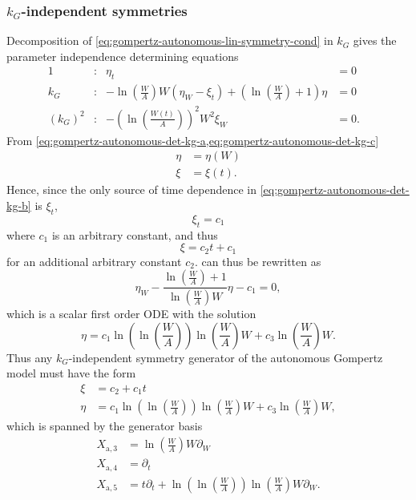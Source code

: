 \subsubsection{\texorpdfstring{\(k_G\)-independent symmetries}{Growth rate-independent symmetries}}

Decomposition of \cref{eq:gompertz-autonomous-lin-symmetry-cond} in \(k_G\) gives the parameter independence determining equations
\begin{subequations}
  \begin{flalign}
    1 & : & \eta_t &= 0 &\label{eq:gompertz-autonomous-det-kg-a}\\
    k_G & : & -\ln\left(\frac{W}{A}\right) W\left(\eta_W - \xi_t\right) + \left(\ln\left(\frac{W}{A}\right) + 1\right) \eta &= 0 &\label{eq:gompertz-autonomous-det-kg-b}\\
    (k_G)^2 & : & -\left(\ln\left(\frac{W(t)}{A}\right)\right)^2 W^2 \xi_W &= 0. &\label{eq:gompertz-autonomous-det-kg-c}
  \end{flalign}
\end{subequations}
From \cref{eq:gompertz-autonomous-det-kg-a,eq:gompertz-autonomous-det-kg-c}
\begin{align*}
  \eta &= \eta(W) \\
  \xi &= \xi(t).
\end{align*}
Hence, since the only source of time dependence in \cref{eq:gompertz-autonomous-det-kg-b} is \(\xi_t\),
\begin{equation*}
  \xi_t = c_1
\end{equation*}
where \(c_1\) is an arbitrary constant, and thus
\begin{equation*}
  \xi = c_2 t + c_1
\end{equation*}
for an additional arbitrary constant \(c_2\).
 can thus be rewritten as
\begin{equation*}
  \eta_W - \frac{\ln\left(\frac{W}{A}\right) + 1}{\ln\left(\frac{W}{A}\right) W} \eta - c_1 = 0,
\end{equation*}
which is a scalar first order ODE with the solution
\begin{equation*}
  \eta = c_1 \ln\left(\ln\left(\frac{W}{A}\right)\right) \ln\left(\frac{W}{A}\right) W + c_3 \ln\left(\frac{W}{A}\right) W.
\end{equation*}
Thus any \(k_G\)-independent symmetry generator of the autonomous Gompertz model  must have the form
\begin{align*}
  \xi &= c_2 + c_1 t \\
  \eta &= c_1 \ln\left(\ln\left(\frac{W}{A}\right)\right) \ln\left(\frac{W}{A}\right) W + c_3 \ln\left(\frac{W}{A}\right) W,
\end{align*}
which is spanned by the generator basis
\begin{align*}
  X_{\text{a},3} &= \ln\left(\frac{W}{A}\right) W \partial_W \\
  X_{\text{a},4} &= \partial_t \\
  X_{\text{a},5} &= t \partial_t + \ln\left(\ln\left(\frac{W}{A}\right)\right) \ln\left(\frac{W}{A}\right) W \partial_W.
\end{align*}

